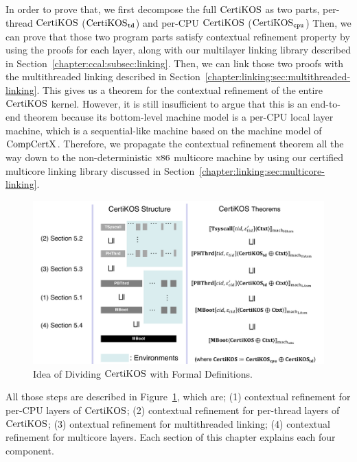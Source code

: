 In order to  prove that, we first decompose the full $\mathrm{CertiKOS}$ as two parts, 
per-thread $\mathrm{CertiKOS}$ ($\mathrm{CertiKOS}_{{\mathrm{\texttt{td}}}}$) and per-CPU $\mathrm{CertiKOS}$ ($\mathrm{CertiKOS}_{{\mathrm{\texttt{cpu}}}}$)
Then, we can prove that those two program parts satisfy contextual refinement property by using the proofs for each layer, 
along with our multilayer linking library described in Section~\ref{chapter:ccal:subsec:linking}. 
Then, we can link those two proofs with the multithreaded linking described in Section~\ref{chapter:linking:sec:multithreaded-linking}. 
This gives us a theorem for the contextual refinement of the entire $\mathrm{CertiKOS}$ kernel. 
However, it is still insufficient to argue that this is an end-to-end theorem because its bottom-level machine model is a per-CPU local layer machine, 
which is a sequential-like machine based on the machine model of 
$\mathrm{CompCertX}$.  %
 Therefore, we propagate the contextual refinement theorem all the way down to the non-deterministic $\mathrm{x86}$ 
 multicore machine by using our certified multicore linking library discussed in Section~\ref{chapter:linking:sec:multicore-linking}.
\begin{figure}
\includegraphics[width=\textwidth, page=1]{figs/certikos/concurrent_linking}
\caption{Idea of Dividing $\mathrm{CertiKOS}$ with Formal Definitions.} 
\label{fig:chapter:certikos:idea-of-dividing-certikos-with-formal-def}
\end{figure}
All those steps are described in Figure~\ref{fig:chapter:certikos:idea-of-dividing-certikos-with-formal-def},
which are; (1) contextual refinement for per-CPU layers of $\mathrm{CertiKOS}$; (2) contextual refinement for per-thread layers of $\mathrm{CertiKOS}$;
(3) ontextual refinement for multithreaded linking; (4) contextual refinement for multicore layers.
Each section of this chapter explains each four component.
%

